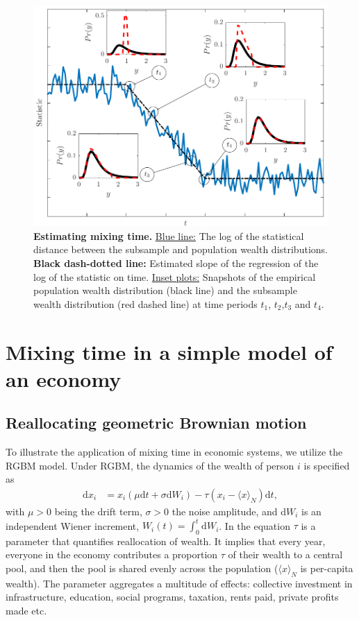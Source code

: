 \documentclass[11pt]{article}
\numberwithin{equation}{section}
\begin{document}
\begin{figure}[t!]
\includegraphics[width=\linewidth]{figs/fig_mixing_time.pdf}
\caption{\textbf{Estimating mixing time.} \underline{Blue line:} The log of the statistical distance between the subsample and population wealth distributions. \textbf{Black dash-dotted line:} Estimated slope of the regression of the log of the statistic on time. \underline{Inset plots:} Snapshots of the empirical population wealth distribution (black line) and the subsample wealth distribution (red dashed line) at time periods $t_1$, $t_2$,$t_3$ and $t_4$. \label{fig:mixing-time}}
\end{figure}


\section{Mixing time in a simple model of an economy}\label{sec:rgbm}

\subsection{Reallocating geometric Brownian motion}
To illustrate the application of mixing time in economic systems, we utilize the RGBM model. Under RGBM, the dynamics of the wealth of person $i$ is specified as
\begin{align}
    \mathrm{d} x_i &= x_i \left( \mu \mathrm{d}t + \sigma \mathrm{d}W_i \right) - \tau \left( x_i - \langle x \rangle_N \right) \mathrm{d}t,
\label{eq:rgbm}
\end{align}
with $\mu > 0$ being the drift term, $\sigma > 0$ the noise amplitude, and $\mathrm{d}W_i$ is an independent Wiener increment, $W_i(t) =\int_0^t \mathrm{d}W_i$. In the equation $\tau$ is a parameter that quantifies reallocation of wealth. It implies that every year, everyone in the economy contributes a proportion $\tau$ of their wealth to a central pool, and then the pool is shared evenly across the population ($\langle x \rangle_N$ is per-capita wealth). The parameter aggregates a multitude of effects: collective investment in infrastructure, education, social programs, taxation, rents paid, private profits made etc. 
\end{document}
